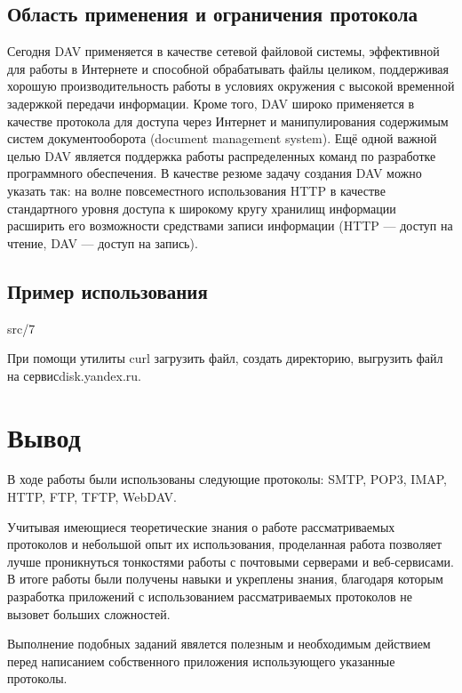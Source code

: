 \subsection{Область применения и ограничения протокола}
Сегодня DAV применяется в качестве сетевой файловой системы, эффективной для работы в Интернете и способной обрабатывать файлы целиком, поддерживая хорошую производительность работы в условиях окружения с высокой временной задержкой передачи информации. Кроме того, DAV широко применяется в качестве протокола для доступа через Интернет и манипулирования содержимым систем документооборота (document management system). Ещё одной важной целью DAV является поддержка работы распределенных команд по разработке программного обеспечения. В качестве резюме задачу создания DAV можно указать так: на волне повсеместного использования HTTP в качестве стандартного уровня доступа к широкому кругу хранилищ информации расширить его возможности средствами записи информации (HTTP — доступ на чтение, DAV — доступ на запись). 

\subsection{Пример использования}
 {src/7}

При помощи утилиты curl загрузить файл, создать директорию, выгрузить файл на сервисdisk.yandex.ru.


\section{Вывод}
В ходе работы были использованы следующие протоколы: SMTP, POP3, IMAP, HTTP, FTP, TFTP, WebDAV.

Учитывая имеющиеся теоретические знания о работе рассматриваемых протоколов и небольшой опыт их использования, проделанная работа позволяет лучше проникнуться тонкостями работы с почтовыми серверами и веб-сервисами. В итоге работы были получены навыки и укреплены знания, благодаря которым разработка приложений с использованием рассматриваемых протоколов не вызовет больших сложностей. 

Выполнение подобных заданий явялется полезным и необходимым действием перед написанием собственного приложения использующего указанные протоколы.



